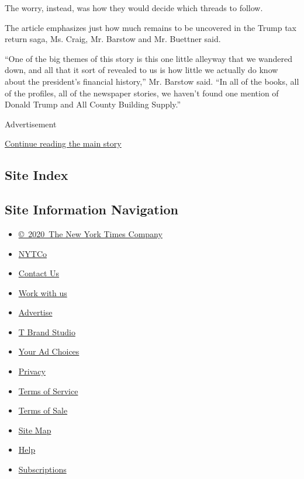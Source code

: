 The worry, instead, was how they would decide which threads to follow.

The article emphasizes just how much remains to be uncovered in the
Trump tax return saga, Ms. Craig, Mr. Barstow and Mr. Buettner said.

``One of the big themes of this story is this one little alleyway that
we wandered down, and all that it sort of revealed to us is how little
we actually do know about the president's financial history,'' Mr.
Barstow said. ``In all of the books, all of the profiles, all of the
newspaper stories, we haven't found one mention of Donald Trump and All
County Building Supply.''

Advertisement

\protect\hyperlink{after-bottom}{Continue reading the main story}

\hypertarget{site-index}{%
\subsection{Site Index}\label{site-index}}

\hypertarget{site-information-navigation}{%
\subsection{Site Information
Navigation}\label{site-information-navigation}}

\begin{itemize}
\tightlist
\item
  \href{https://help.nytimes.com/hc/en-us/articles/115014792127-Copyright-notice}{©~2020~The
  New York Times Company}
\end{itemize}

\begin{itemize}
\tightlist
\item
  \href{https://www.nytco.com/}{NYTCo}
\item
  \href{https://help.nytimes.com/hc/en-us/articles/115015385887-Contact-Us}{Contact
  Us}
\item
  \href{https://www.nytco.com/careers/}{Work with us}
\item
  \href{https://nytmediakit.com/}{Advertise}
\item
  \href{http://www.tbrandstudio.com/}{T Brand Studio}
\item
  \href{https://www.nytimes.com/privacy/cookie-policy\#how-do-i-manage-trackers}{Your
  Ad Choices}
\item
  \href{https://www.nytimes.com/privacy}{Privacy}
\item
  \href{https://help.nytimes.com/hc/en-us/articles/115014893428-Terms-of-service}{Terms
  of Service}
\item
  \href{https://help.nytimes.com/hc/en-us/articles/115014893968-Terms-of-sale}{Terms
  of Sale}
\item
  \href{https://spiderbites.nytimes.com}{Site Map}
\item
  \href{https://help.nytimes.com/hc/en-us}{Help}
\item
  \href{https://www.nytimes.com/subscription?campaignId=37WXW}{Subscriptions}
\end{itemize}
